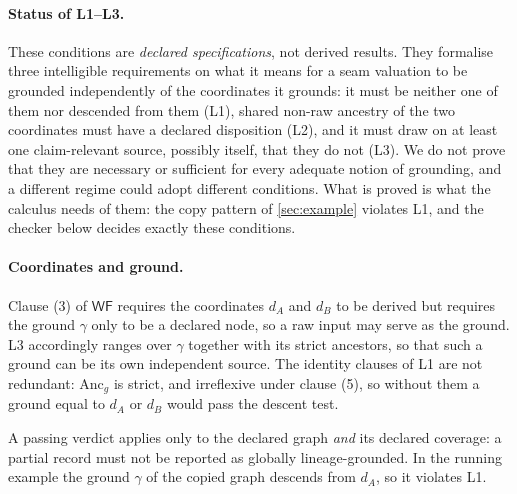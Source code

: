\paragraph{Status of L1--L3.} These conditions are \emph{declared specifications}, not derived results. They formalise three intelligible requirements on what it means for a seam valuation to be grounded independently of the coordinates it grounds: it must be neither one of them nor descended from them (L1), shared non-raw ancestry of the two coordinates must have a declared disposition (L2), and it must draw on at least one claim-relevant source, possibly itself, that they do not (L3). We do not prove that they are necessary or sufficient for every adequate notion of grounding, and a different regime could adopt different conditions. What is proved is what the calculus needs of them: the copy pattern of \cref{sec:example} violates L1, and the checker below decides exactly these conditions.

\paragraph{Coordinates and ground.} Clause (3) of $\mathsf{WF}$ requires the coordinates $d_A$ and $d_B$ to be derived but requires the ground $\gamma$ only to be a declared node, so a raw input may serve as the ground. L3 accordingly ranges over $\gamma$ together with its strict ancestors, so that such a ground can be its own independent source. The identity clauses of L1 are not redundant: $\mathrm{Anc}_g$ is strict, and irreflexive under clause (5), so without them a ground equal to $d_A$ or $d_B$ would pass the descent test.

A passing verdict applies only to the declared graph \emph{and} its declared coverage: a partial record must not be reported as globally lineage-grounded. In the running example the ground $\gamma$ of the copied graph descends from $d_A$, so it violates L1.

